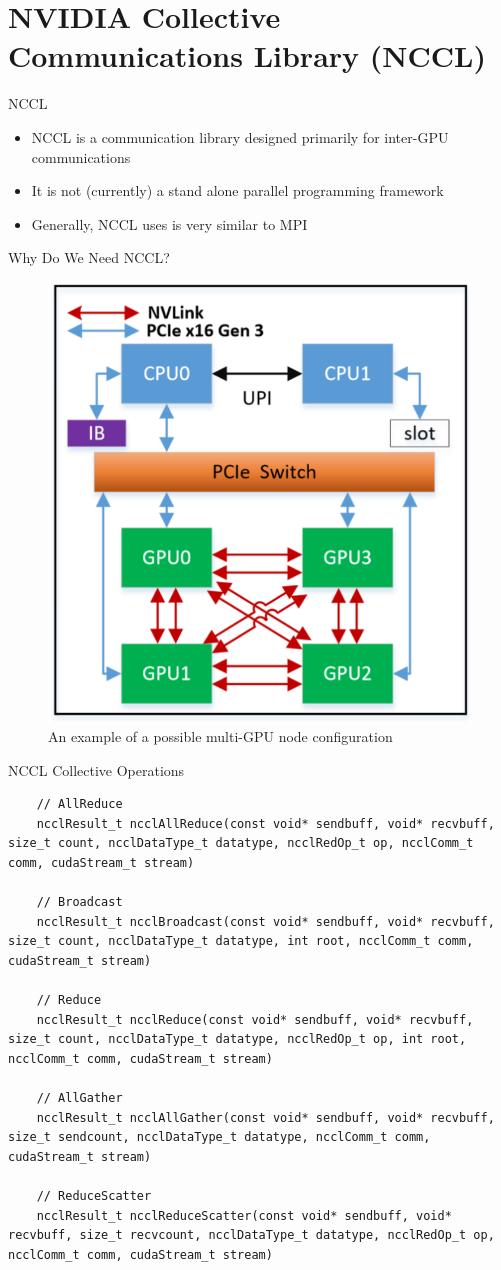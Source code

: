 \section{NVIDIA Collective Communications Library (NCCL)}

\begin{frame}{NCCL}
\begin{itemize}
\item NCCL is a communication library designed primarily for inter-GPU communications
\item It is not (currently) a stand alone parallel programming framework 
\item Generally, NCCL uses is very similar to MPI
\end{itemize}
\end{frame}

\begin{frame}{Why Do We Need NCCL?}
	\begin{figure}
		\centering
		\includegraphics[width=0.45\linewidth]{figures/example_gpu_node_interconnect.png}
		\caption{An example of a possible multi-GPU node configuration}
	\end{figure}
\end{frame}

\begin{frame}[fragile]{NCCL Collective Operations}

\begin{verbatim}
	// AllReduce
	ncclResult_t ncclAllReduce(const void* sendbuff, void* recvbuff, size_t count, ncclDataType_t datatype, ncclRedOp_t op, ncclComm_t comm, cudaStream_t stream)
	
	// Broadcast
	ncclResult_t ncclBroadcast(const void* sendbuff, void* recvbuff, size_t count, ncclDataType_t datatype, int root, ncclComm_t comm, cudaStream_t stream)
	
	// Reduce
	ncclResult_t ncclReduce(const void* sendbuff, void* recvbuff, size_t count, ncclDataType_t datatype, ncclRedOp_t op, int root, ncclComm_t comm, cudaStream_t stream)
	
	// AllGather
	ncclResult_t ncclAllGather(const void* sendbuff, void* recvbuff, size_t sendcount, ncclDataType_t datatype, ncclComm_t comm, cudaStream_t stream)
	
	// ReduceScatter
	ncclResult_t ncclReduceScatter(const void* sendbuff, void* recvbuff, size_t recvcount, ncclDataType_t datatype, ncclRedOp_t op, ncclComm_t comm, cudaStream_t stream)
\end{verbatim}
\end{frame}

